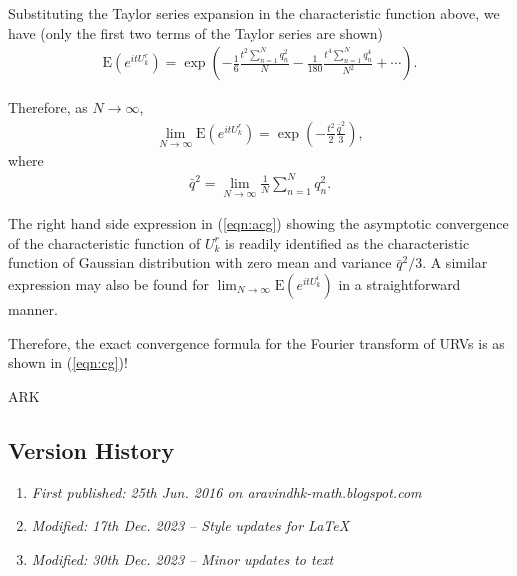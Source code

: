 Substituting the Taylor series expansion in the characteristic function above, we have (only the first two terms of the Taylor series are shown)
\begin{align}\text{E}(e^{itU_k^r}) = \exp\left(-\frac{1}{6} \frac{t^2 \sum_{n = 1}^{N} q^2_n}{N} - \frac{1}{180}\frac{t^4 \sum_{n = 1}^{N} q^4_n}{N^2} + \cdots\right). \label{eqn:cg}\end{align}

Therefore, as $N\to \infty$, 
\begin{align}\lim_{N\to \infty} \text{E}(e^{itU_k^r}) = \exp\left(-\frac{t^2}{2} \frac{\bar{q}^2}{3}\right), \label{eqn:acg} \end{align}
where
\begin{align}\bar{q}^2 = \lim_{N\to \infty} \frac{1}{N}\sum_{n = 1}^{N} q_n^2.\end{align}

The right hand side expression in (\ref{eqn:acg}) showing the asymptotic convergence of the characteristic function of $U^r_k$ is readily identified as the characteristic function of Gaussian distribution with zero mean and variance $\bar{q}^2/3$. A similar expression may also be found for $\lim_{N\to \infty} \text{E}(e^{itU_k^i})$ in a straightforward manner.

Therefore, the exact convergence formula for the Fourier transform of URVs is as shown in (\ref{eqn:cg})!

ARK

\subsection{Version History}
\begin{enumerate}
	\item \emph{First published: 25th Jun. 2016 on aravindhk-math.blogspot.com}
	\item \emph{Modified: 17th Dec. 2023 -- Style updates for \LaTeX}
	\item \emph{Modified: 30th Dec. 2023 -- Minor updates to text}
\end{enumerate}



